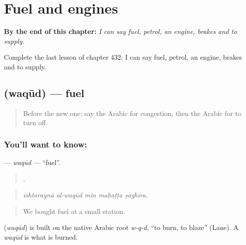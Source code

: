 
\chapter{Fuel and engines}
\label{ch:ar-fuel-and-engines}

\begin{chapteropening}
\textbf{By the end of this chapter:} \emph{I can say fuel, petrol, an engine, brakes and to supply.}

Complete the last lesson of chapter 432: I can say fuel, petrol, an engine, brakes and to supply.
\end{chapteropening}

\section[\texorpdfstring{\ar{وقود} (waqūd)}{وقود (waqūd)}]{ (waqūd) — fuel}

\label{lesson:AR-C432-waqud}



\begin{quote}
Before the new one: say the Arabic for congestion, then the Arabic for to turn off.
\end{quote}

\subsection*{You'll want to know: }
\textbf{} — \emph{waqūd} — \textquotedblleft{}fuel\textquotedblright{}.

\begin{quote}
    .
\end{quote}

\begin{quote}
\emph{ishtaraynā al-waqūd min maḥaṭṭa ṣaghīra.}
\end{quote}

\begin{quote}
We bought fuel at a small station.
\end{quote}

\begin{cousinweb}
\textbf{} (\emph{waqūd}) is built on the native Arabic root \emph{w-q-d}, \textquotedblleft{}to burn, to blaze\textquotedblright{} (Lane). A \emph{waqūd} is what is burned.
\end{cousinweb}

